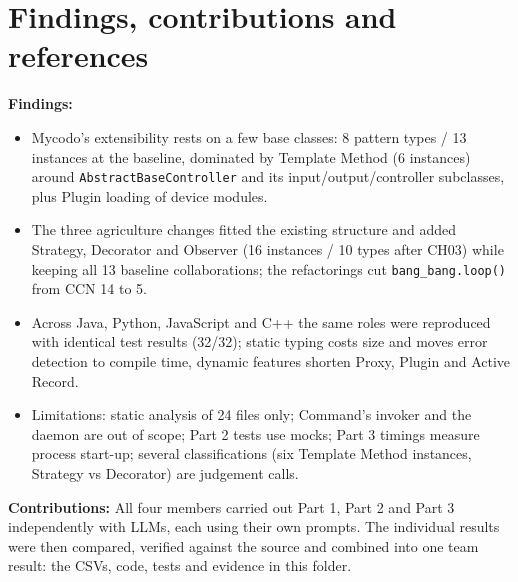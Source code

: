 \documentclass[11pt,a4paper]{article}
\begin{document}
\section{Findings, contributions and references}
\textbf{Findings:}\par
\begin{itemize}
\item Mycodo's extensibility rests on a few base classes: 8 pattern types / 13 instances at the baseline, dominated by Template Method (6 instances) around \texttt{AbstractBaseController} and its input/output/controller subclasses, plus Plugin loading of device modules.
\item The three agriculture changes fitted the existing structure and added Strategy, Decorator and Observer (16 instances / 10 types after CH03) while keeping all 13 baseline collaborations; the refactorings cut \texttt{bang\_\allowbreak{}bang.\allowbreak{}loop()} from CCN 14 to 5.
\item Across Java, Python, JavaScript and C++ the same roles were reproduced with identical test results (32/32); static typing costs size and moves error detection to compile time, dynamic features shorten Proxy, Plugin and Active Record.
\item Limitations: static analysis of 24 files only; Command's invoker and the daemon are out of scope; Part 2 tests use mocks; Part 3 timings measure process start-up; several classifications (six Template Method instances, Strategy vs Decorator) are judgement calls.
\end{itemize}
\textbf{Contributions:} All four members carried out Part 1, Part 2 and Part 3 independently with LLMs, each using their own prompts. The individual results were then compared, verified against the source and combined into one team result: the CSVs, code, tests and evidence in this folder.\par
\end{document}
